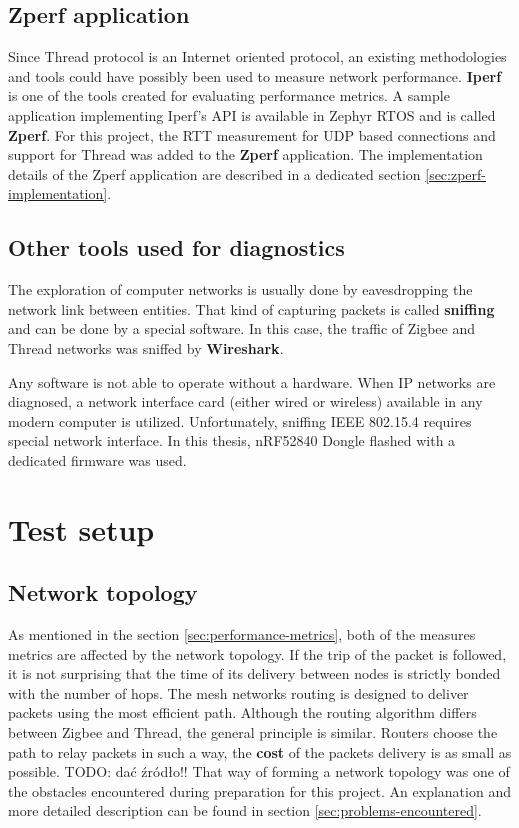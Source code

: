 \subsection{Zperf application}
\label{sec:zperf}

Since Thread protocol is an Internet oriented protocol, an existing methodologies and tools could have possibly been used to measure network performance. \textbf{Iperf} is one of the tools created for evaluating performance metrics. A sample application implementing Iperf's API is available in Zephyr RTOS and is called \textbf{Zperf}. For this project, the RTT measurement for UDP based connections and support for Thread was added to the \textbf{Zperf} application. The implementation details of the Zperf application are described in a dedicated section \ref{sec:zperf-implementation}.

\subsection{Other tools used for diagnostics}
\label{sec:tools}

The exploration of computer networks is usually done by eavesdropping the network link between entities. That kind of capturing packets is called \textbf{sniffing} and can be done by a special software. In this case, the traffic of Zigbee and Thread networks was sniffed by \textbf{Wireshark}. 

Any software is not able to operate without a hardware. When IP networks are diagnosed, a network 
interface card (either wired or wireless) available in any modern computer is utilized. Unfortunately, 
sniffing IEEE 802.15.4 requires special network interface. In this thesis, nRF52840 Dongle flashed with 
a dedicated firmware was used.

\medskip
\section{Test setup}
\subsection{Network topology}
\label{sec:network-topology}

As mentioned in the section \ref{sec:performance-metrics}, both of the measures metrics are affected by
the network topology. If the trip of the packet is followed, it is not surprising that the time of its 
delivery between nodes is strictly bonded with the number of hops. The mesh networks routing is designed to deliver packets using the most efficient path. Although the routing algorithm differs between Zigbee and Thread,
the general principle is similar. Routers choose the path to relay packets in such a way, the \textbf{cost}
of the packets delivery is as small as possible. TODO: dać źródło!! That way of forming a network topology
was one of the obstacles encountered during preparation for this project. An explanation and more detailed
description can be found in section \ref{sec:problems-encountered}.

